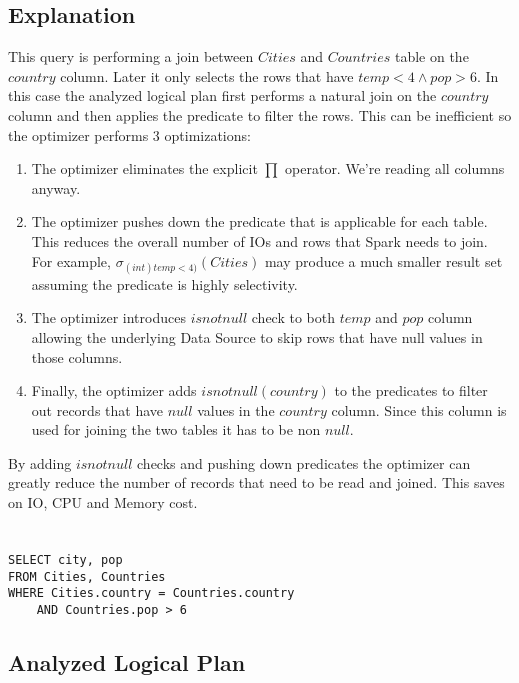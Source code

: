 \documentclass[12pt]{article}
\begin{document}
\subsection*{Explanation}

This query is performing a join between $Cities$ and $Countries$ table on the $country$ column. Later it only selects the rows that have $temp < 4 \wedge pop > 6$. In this case the analyzed logical plan first performs a natural join on the $country$ column and then applies the predicate to filter the rows. This can be inefficient so the optimizer performs 3 optimizations:

\begin{enumerate}
\item The optimizer eliminates the explicit $\prod$ operator. We're reading all columns anyway.

\item The optimizer pushes down the predicate that is applicable for each table. This reduces the overall number of IOs and rows that Spark needs to join. For example, $\sigma_{(int)temp < 4)}(Cities)$ may produce a much smaller result set assuming the predicate is highly selectivity.


\item The optimizer introduces $isnotnull$ check to both $temp$ and $pop$ column allowing the underlying Data Source to skip rows that have null values in those columns.

\item Finally, the optimizer adds $isnotnull(country)$ to the predicates to filter out records that have $null$ values in the $country$ column. Since this column is used for joining the two tables it has to be non $null$.

\end{enumerate}

By adding $isnotnull$ checks and pushing down predicates the optimizer can greatly reduce the number of records that need to be read and joined. This saves on IO, CPU and Memory cost.
\newpage

\section{}
\begin{verbatim}
SELECT city, pop
FROM Cities, Countries
WHERE Cities.country = Countries.country
    AND Countries.pop > 6
\end{verbatim}

\subsection*{Analyzed Logical Plan}
\end{document}
